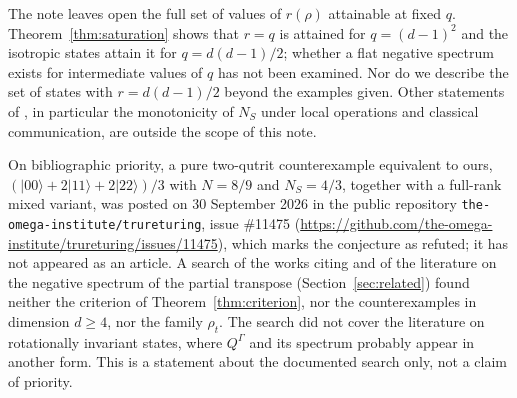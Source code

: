 \documentclass[11pt,a4paper]{article}
\theoremstyle{definition}
\theoremstyle{plain}
\newcommand{\ket}[1]{\lvert#1\rangle}
\newcommand{\NS}{N_{S}}
\newcommand{\G}{\Gamma}
\begin{document}
The note leaves open the full set of values of $r(\rho)$ attainable at fixed
$q$. Theorem~\ref{thm:saturation} shows that $r=q$ is attained for
$q=(d-1)^2$ and the isotropic states attain it for $q=d(d-1)/2$; whether a
flat negative spectrum exists for intermediate values of $q$ has not been
examined. Nor do we describe the set of states with $r=d(d-1)/2$ beyond the
examples given. Other statements of \cite{KumariAdhikari2022}, in particular
the monotonicity of $\NS$ under local operations and classical communication,
are outside the scope of this note.

On bibliographic priority, a pure two-qutrit counterexample equivalent to
ours, $(\ket{00}+2\ket{11}+2\ket{22})/3$ with $N=8/9$ and $\NS=4/3$, together
with a full-rank mixed variant, was posted on 30 September 2026 in the public
repository \texttt{the-omega-institute/trureturing}, issue \#11475
(\url{https://github.com/the-omega-institute/trureturing/issues/11475}),
which marks the conjecture as refuted; it has not appeared as an article.
A search of the works citing \cite{KumariAdhikari2022} and of the literature
on the negative spectrum of the partial transpose
(Section~\ref{sec:related}) found neither the criterion of
Theorem~\ref{thm:criterion}, nor the counterexamples in dimension $d\ge4$,
nor the family $\rho_t$. The search did not cover the literature on
rotationally invariant states, where $Q^\G$ and its spectrum probably appear
in another form. This is a statement about the documented search only, not a
claim of priority.
\end{document}
